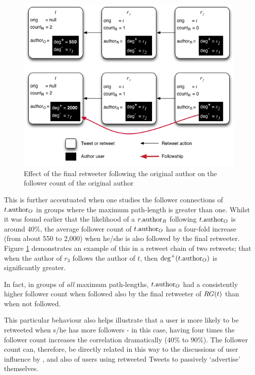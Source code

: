 \begin{figure}[h]
\centering
\includegraphics[scale=0.7]{3.Chapter1/Media/final_following_original.png} 
\caption{Effect of the final retweeter following the original author on the follower count of the original author}
\label{fig:final_following_original}
\end{figure}

This is further accentuated when one studies the follower connections of $t.\textrm{author}_O$ in groups where the maximum path-length is greater than one. Whilst it was found earlier that the likelihood of a $r.\textrm{author}_R$ following $t.\textrm{author}_O$ is around 40\%, the average follower count of $t.\textrm{author}_O$ has a four-fold increase (from about 550 to 2,000) when he/she is also followed by the final retweeter. Figure \ref{fig:final_following_original} demonstrates an example of this in a retweet chain of two retweets; that when the author of $r_3$ follows the author of $t$, then $\textrm{deg}^+(t.\textrm{author}_O)$ is significantly greater. 

In fact, in groups of \textit{all} maximum path-lengths, $t.\textrm{author}_O$ had a consistently higher follower count when followed also by the final retweeter of $RG(t)$ than when not followed.

This particular behaviour also helps illustrate that a user is more likely to be retweeted when s/he has more followers - in this case, having four times the follower count increases the correlation dramatically (40\% to 90\%). The follower count can, therefore, be directly related in this way to the discussions of user influence by \citet{cha10}, and also of users using retweeted Tweets to passively `advertise' themselves.

